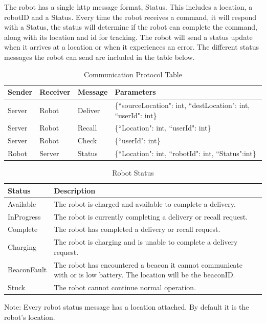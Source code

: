 \documentclass[12pt]{report}
\begin{document}
The robot has a single http message format, Status. This includes a location, a robotID and a Status. Every time the robot receives a command, it will respond with a Status, the status will determine if the robot can complete the command, along with its location and id for tracking. The robot will send a status update when it arrives at a location or when it experiences an error. The different status messages the robot can send are included in the table below.

\begin{table}[H]
\centering
\caption{Communication Protocol Table}
\centering
\begin{tabular} { | p{2cm} | p{2cm} | p{2cm} | p{8cm} | }
\hline
Sender & Receiver & Message & Parameters \\
\hline
Server & Robot & Deliver & \{``sourceLocation": int, ``destLocation": int, ``userId": int\} \\
\hline
Server & Robot & Recall & \{``Location": int, ``userId": int\} \\
\hline
Server & Robot & Check & \{``userId": int\} \\
\hline
Robot & Server & Status & \{``Location": int, ``robotId": int, ``Status":int\} \\
\hline
\end{tabular}
\end{table}%

\begin{table}[H]
\centering
\caption{Robot Status}
\centering
\begin{tabular} { | p{2.5cm} | p{12cm} | }
\hline
Status& Description \\
\hline
Available & The robot is charged and available to complete a delivery. \\
\hline
InProgress & The robot is currently completing a delivery or recall request. \\
\hline
Complete & The robot has completed a delivery or recall request. \\
\hline
Charging & The robot is charging and is unable to complete a delivery request. \\
\hline
BeaconFault & The robot has encountered a beacon it cannot communicate with or is low battery. The location will be the beaconID. \\
\hline
Stuck & The robot cannot continue normal operation. \\
\hline
\end{tabular}
\begin{tablenotes}
      \small
      \centering
      \item Note: Every robot status message has a location attached. By default it is the robot's location.
\end{tablenotes}
\end{table}%
\end{document}
